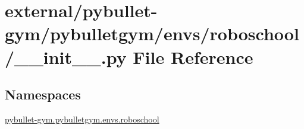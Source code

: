 \hypertarget{external_2pybullet-gym_2pybulletgym_2envs_2roboschool_2____init_____8py}{}\section{external/pybullet-\/gym/pybulletgym/envs/roboschool/\+\_\+\+\_\+init\+\_\+\+\_\+.py File Reference}
\label{external_2pybullet-gym_2pybulletgym_2envs_2roboschool_2____init_____8py}
\subsection*{Namespaces}
\begin{DoxyCompactItemize}
\item 
 \hyperlink{namespacepybullet-gym_1_1pybulletgym_1_1envs_1_1roboschool}{pybullet-\/gym.\+pybulletgym.\+envs.\+roboschool}
\end{DoxyCompactItemize}
